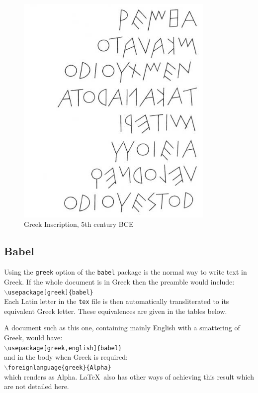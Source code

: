 \begin{figure}[h]
	\centering
		\includegraphics[width=0.85\textwidth]
		            {Greek_Inscription.jpg}
	\caption*{Greek Inscription, 5th century BCE}
	\label{fig:Greek_Inscription}
\end{figure}

\subsection{Babel}
Using the \texttt{greek} option of the \texttt{babel} package is the normal way to write text in Greek. If the whole document is in Greek then the preamble would include: \\
\indent $\backslash$\texttt{usepackage[greek]\{babel\}} \\
Each Latin letter in the \texttt{tex} file is then automatically transliterated to its equivalent Greek letter. These equivalences are given in the tables below.

A document such as this one, containing mainly English with a smattering of Greek, would have: \\
\indent $\backslash$\texttt{usepackage[greek,english]\{babel\}} \\
and in the body when Greek is required: \\
\indent $\backslash$\texttt{foreignlanguage\{greek\}\{Alpha\}} \\
which renders as \foreignlanguage{greek}{Alpha}.
\LaTeX\ also has other ways of achieving this result which are not detailed here.

